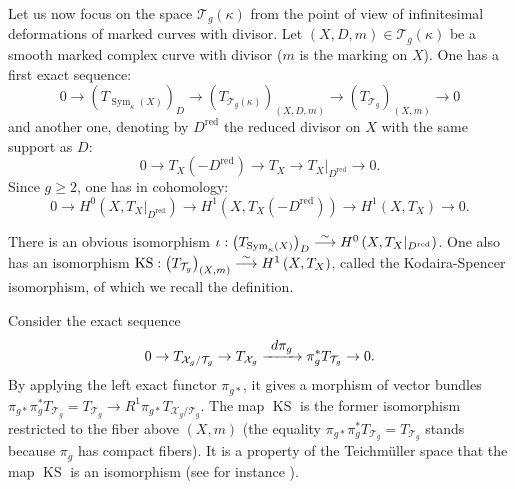 \documentclass[10pt]{amsart}
\newcommand\To[1]{\mathchoice{\xrightarrow{\textstyle\kern4pt#1\kern3pt}}{\stackrel{#1}{\longrightarrow}}{}{}}
\newcommand{\red}{\mathrm{red}}
\DeclareMathOperator{\KS}{KS}
\DeclareMathOperator{\Sym}{Sym}
\theoremstyle{definition}
\theoremstyle{plain}
\begin{document}
Let us now focus on the space $\mathcal T_g(\kappa)$ from the point of view of infinitesimal deformations of marked curves with divisor.
Let $(X, D, m) \in \mathcal T_g(\kappa)$ be a smooth marked complex curve with divisor ($m$ is the marking on $X$).
One has a first exact sequence:
\begin{equation}\label{eq_exact_tan_teich}
0 \to \left(T_{\Sym_{\kappa}(X)}\right)_D \to \left(T_{\mathcal T_g(\kappa)}\right)_{(X, D, m)} \to \left(T_{\mathcal T_g}\right)_{(X, m)} \to 0
\end{equation}
and another one, denoting by $D^{\red}$ the reduced divisor on $X$ with the same support as $D$:
\begin{equation*}
0 \to T_X\left(-D^{\red}\right) \to T_X \to T_X|_{D^{\red}} \to 0.
\end{equation*}
Since $g \ge 2$, one has in cohomology:
\begin{equation*}
0 \to H^0\left(X, T_X|_{D^{\red}}\right) \to H^1\left(X, T_X\left(-D^{\red}\right)\right) \to H^1\left(X, T_X\right) \to 0.
\end{equation*}

There is an obvious isomorphism $\iota: \left(T_{\Sym_{\kappa}(X)}\right)_D \To{\sim} H^0\left(X, T_X|_{D^{\red}}\right)$.
One also has an isomorphism $\KS: \left(T_{\mathcal T_g}\right)_{(X, m)} \To{\sim} H^1\left(X, T_X\right)$, called the Kodaira-Spencer isomorphism, of which we recall the definition.

Consider the exact sequence\vspace*{-3pt}
\begin{equation}\label{eq_kodaira_spencer_exact_sequence}
0 \to T_{\mathcal X_g/\mathcal T_g} \to T_{\mathcal X_g} \To{d\pi_g} \pi_g^*T_{\mathcal T_g} \to 0.
\end{equation}
By applying the left exact functor $\pi_{g*}$, it gives a morphism of vector bundles $\pi_{g*}\pi_g^*T_{\mathcal T_g} = T_{\mathcal T_g} \to R^1\pi_{g*}T_{\mathcal X_g/\mathcal T_g}$.
The map $\KS$ is the former isomorphism restricted to the fiber above $(X, m)$ (the equality $\pi_{g*}\pi_g^* T_{\mathcal T_g} = T_{\mathcal T_g}$ stands because $\pi_g$ has compact fibers).
It is a property of the Teichmüller space that the map $\KS$ is an isomorphism (see for instance \cite{earle-eells}).
\end{document}
